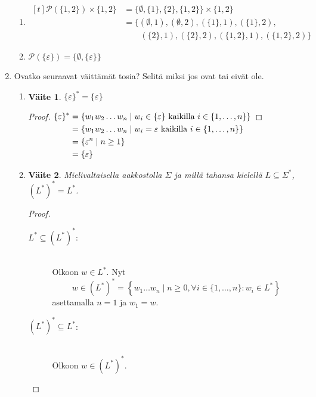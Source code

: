 \documentclass[a4paper,11pt,draft]{article}
\newtheorem*{claim}{Väite}
\begin{document}
\begin{enumerate}
\begin{enumerate}
  \item
    \begin{math}
      \begin{aligned}[t]
        \mathcal{P}(\{1,2\}) \times \{1,2\}
        &= \{\emptyset, \{1\}, \{2\}, \{1,2\}\} \times \{1,2\} \\
        &= \{(\emptyset, 1), (\emptyset, 2), (\{1\}, 1), (\{1\}, 2),\\
        &\qquad(\{2\}, 1), (\{2\}, 2), (\{1,2\}, 1), (\{1,2\}, 2)\}
      \end{aligned}
    \end{math}

  \item
    $\mathcal{P}(\{\varepsilon\}) = \{\emptyset, \{\varepsilon\}\}$
  \end{enumerate}

\item Ovatko seuraavat väittämät tosia? Selitä miksi jos ovat tai
  eivät ole.
  \begin{enumerate}
  \item
    \begin{claim}
      $\{\varepsilon\}^{*} = \{\varepsilon\}$
    \end{claim}
    \begin{proof}
    \begin{math}
      \begin{aligned}[t]
        \{\varepsilon\}^*
        &= \{w_1w_2 \ldots w_n \mid w_i \in \{\varepsilon\}
           \text{ kaikilla } i \in \{1, \ldots, n\}\}\\
        &= \{w_1w_2 \ldots w_n \mid w_i = \varepsilon
           \text{ kaikilla } i \in \{1, \ldots, n\}\}\\
        &= \{\varepsilon^n \mid n \ge 1\}\\
        &= \{\varepsilon\} \qedhere
      \end{aligned}
    \end{math}
    \end{proof}

\newpage
  \item
    \begin{claim}
      Mielivaltaisella aakkostolla $\Sigma$ ja millä tahansa kielellä
      $L \subseteq \Sigma^*$, $(L^*)^* = L^*$.
    \end{claim}
    \begin{proof}
      \hfill
      \begin{description}
      \item[$L^* \subseteq (L^*)^*$:] \hfill \\
        Olkoon $w \in L^*$. Nyt
        \begin{equation*}
        w \in (L^*)^* = \left\{w_1 \ldots w_n \mid n \ge 0,\forall i
        \in \{1, \ldots, n\}: w_i \in L^* \right\}
        \end{equation*}
        asettamalla $n = 1$ ja $w_1 = w$.
      \item[$(L^*)^* \subseteq L^*$:] \hfill \\
        Olkoon $w \in (L^*)^*$.


\end{description}
\end{proof}
\end{enumerate}
\end{enumerate}
\end{document}
